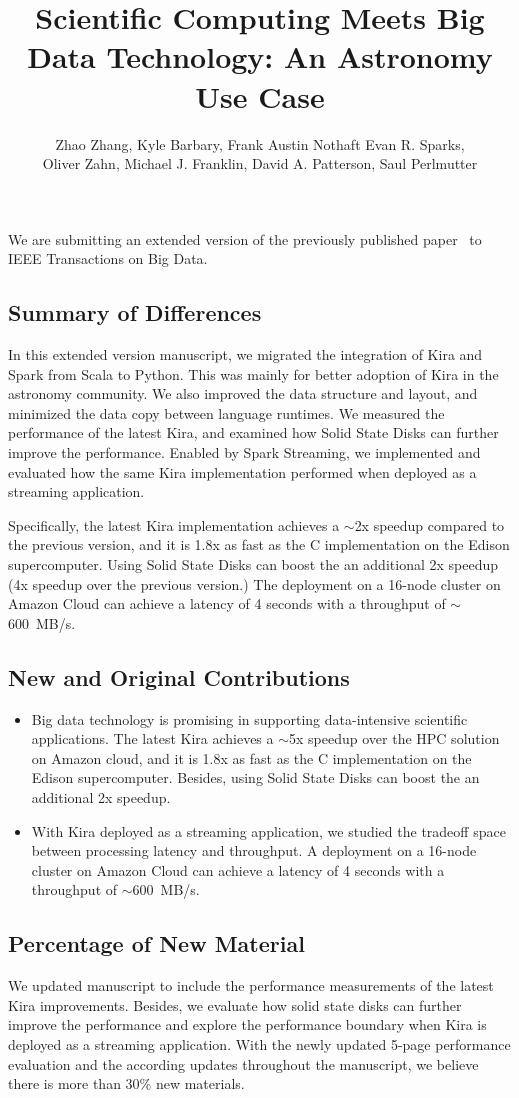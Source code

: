 \documentclass[10pt,a4paper]{article}
\title{Scientific Computing Meets Big Data Technology: An Astronomy Use Case}
\author{Zhao Zhang, Kyle Barbary, Frank Austin Nothaft Evan R. Sparks, \\Oliver Zahn, Michael J. Franklin, David A. Patterson, Saul Perlmutter}
\begin{document}
\maketitle
\noindent We are submitting an extended version of the previously published paper~\cite{lamport94} to IEEE Transactions on Big Data.
\subsection*{Summary of Differences}
In this extended version manuscript, we migrated the integration of Kira and Spark from Scala to Python. 
This was mainly for better adoption of Kira in the astronomy community. 
We also improved the data structure and layout, and minimized the data copy between language runtimes.
We measured the performance of the latest Kira, and examined how Solid State Disks can further improve the performance.
Enabled by Spark Streaming, we implemented and evaluated how the same Kira implementation performed when deployed
as a streaming application. 


Specifically, the latest Kira implementation achieves a $\sim$2x speedup compared to the previous version, and it is 1.8x as fast as
the C implementation on the Edison supercomputer. 
Using Solid State Disks can boost the an additional 2x speedup (4x speedup over the previous version.)
The deployment on a 16-node cluster on Amazon Cloud can achieve a latency of 4 seconds with a throughput of $\sim$600~MB/s.

\subsection*{New and Original Contributions}
\begin{itemize}
\item{} Big data technology is promising in supporting data-intensive scientific applications.
The latest Kira achieves a $\sim$5x speedup over the HPC solution on Amazon cloud, 
and it is 1.8x as fast as the C implementation on the Edison supercomputer. 
Besides, using Solid State Disks can boost the an additional 2x speedup.
\item{} With Kira deployed as a streaming application, we studied the tradeoff space between processing latency and throughput.
A deployment on a 16-node cluster on Amazon Cloud can achieve a latency of 4 seconds with a throughput of $\sim$600~MB/s.
\end{itemize}

\subsection*{Percentage of New Material}
We updated manuscript to include the performance measurements of the latest Kira improvements. 
Besides, we evaluate how solid state disks can further improve the performance and explore the performance boundary when Kira
is deployed as a streaming application.
With the newly updated 5-page performance evaluation and the according updates throughout the manuscript, we believe there is more
than 30\% new materials.
\end{document}
